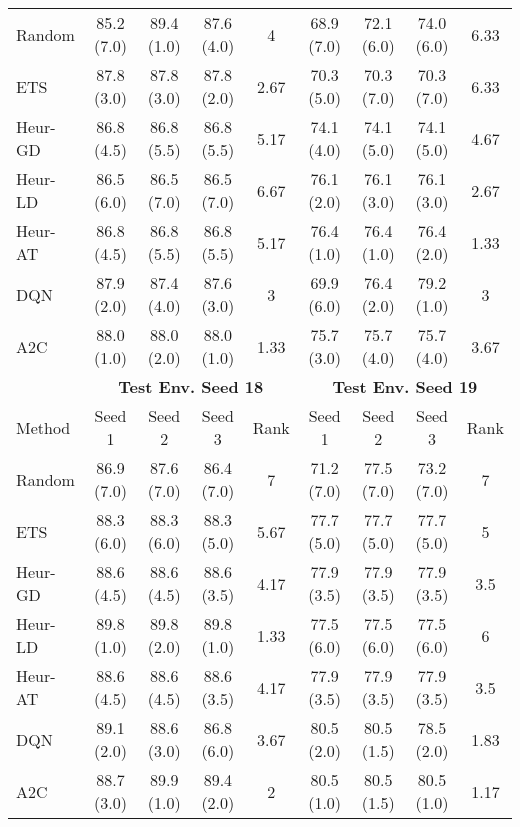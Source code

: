 \begin{table}[t]
{\begin{tabular}{lcccccccc}
Random     & 85.2 (7.0)  & 89.4 (1.0)  & 87.6 (4.0)  & 4    & 68.9 (7.0)  & 72.1 (6.0)  & 74.0 (6.0)  & 6.33 \\
ETS        & 87.8 (3.0)  & 87.8 (3.0)  & 87.8 (2.0)  & 2.67 & 70.3 (5.0)  & 70.3 (7.0)  & 70.3 (7.0)  & 6.33 \\
Heur-GD & 86.8 (4.5)  & 86.8 (5.5)  & 86.8 (5.5)  & 5.17 & 74.1 (4.0)  & 74.1 (5.0)  & 74.1 (5.0)  & 4.67 \\
Heur-LD & 86.5 (6.0)  & 86.5 (7.0)  & 86.5 (7.0)  & 6.67 & 76.1 (2.0)  & 76.1 (3.0)  & 76.1 (3.0)  & 2.67 \\
Heur-AT & 86.8 (4.5)  & 86.8 (5.5)  & 86.8 (5.5)  & 5.17 & 76.4 (1.0)  & 76.4 (1.0)  & 76.4 (2.0)  & 1.33 \\
DQN        & 87.9 (2.0)  & 87.4 (4.0)  & 87.6 (3.0)  & 3    & 69.9 (6.0)  & 76.4 (2.0)  & 79.2 (1.0)  & 3    \\
A2C        & 88.0 (1.0)  & 88.0 (2.0)  & 88.0 (1.0)  & 1.33 & 75.7 (3.0)  & 75.7 (4.0)  & 75.7 (4.0)  & 3.67 \\ \midrule
\textbf{}  & \multicolumn{4}{c}{\textbf{Test Env. Seed 18}} & \multicolumn{4}{c}{\textbf{Test Env. Seed 19}} \\
\cmidrule(lr){2-5} \cmidrule(lr){6-9} 
Method     & Seed 1      & Seed 2      & Seed 3      & Rank & Seed 1      & Seed 2      & Seed 3      & Rank \\ \midrule
Random     & 86.9 (7.0)  & 87.6 (7.0)  & 86.4 (7.0)  & 7    & 71.2 (7.0)  & 77.5 (7.0)  & 73.2 (7.0)  & 7    \\
ETS        & 88.3 (6.0)  & 88.3 (6.0)  & 88.3 (5.0)  & 5.67 & 77.7 (5.0)  & 77.7 (5.0)  & 77.7 (5.0)  & 5    \\
Heur-GD & 88.6 (4.5)  & 88.6 (4.5)  & 88.6 (3.5)  & 4.17 & 77.9 (3.5)  & 77.9 (3.5)  & 77.9 (3.5)  & 3.5  \\
Heur-LD & 89.8 (1.0)  & 89.8 (2.0)  & 89.8 (1.0)  & 1.33 & 77.5 (6.0)  & 77.5 (6.0)  & 77.5 (6.0)  & 6    \\
Heur-AT & 88.6 (4.5)  & 88.6 (4.5)  & 88.6 (3.5)  & 4.17 & 77.9 (3.5)  & 77.9 (3.5)  & 77.9 (3.5)  & 3.5  \\
DQN        & 89.1 (2.0)  & 88.6 (3.0)  & 86.8 (6.0)  & 3.67 & 80.5 (2.0)  & 80.5 (1.5)  & 78.5 (2.0)  & 1.83 \\
A2C        & 88.7 (3.0)  & 89.9 (1.0)  & 89.4 (2.0)  & 2    & 80.5 (1.0)  & 80.5 (1.5)  & 80.5 (1.0)  & 1.17 \\
\bottomrule
\end{tabular}
}
\end{table}
